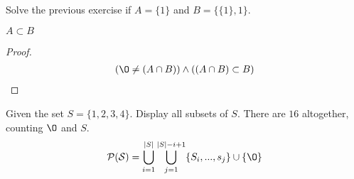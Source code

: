 \begin{question}
Solve the previous exercise if $A = \{1\}$ and $B = \{ \{1 \}, 1 \}$.
  \begin{subquestion}
    $A \subset B$
  \end{subquestion}
  \begin{proof}
    \begin{equation}
      \begin{split}
        (\O \neq (A \cap B)) \land ((A \cap B) \subset B)
      \end{split}
    \end{equation}
  \end{proof}
\end{question}
\begin{question}
Given the set $S = \{1, 2, 3, 4\}$. Display all subsets of $S$. There are $16$ altogether, counting $\O$ and $S$.
  \begin{equation}
    \begin{split}
      \mathcal{P(S)} = \bigcup\limits_{i=1}^{|S|} \bigcup\limits_{j=1}^{|S|-i+1} \{S_{i}, ..., s_{j}\} \cup \{\O\}
    \end{split}
  \end{equation}
\end{question}

